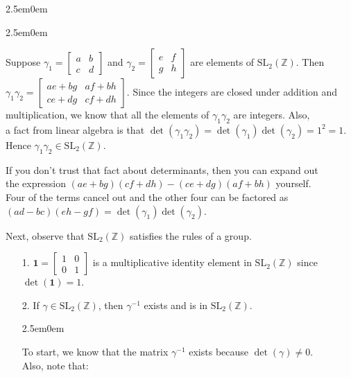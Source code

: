 \documentclass{book}
\newcommand{\exTwoP}{%
   \color{RedViolet}%
   \fontsize{13}{15}\selectfont%
}
\newcommand{\exPP}{%
   \color{RedViolet}%
   \fontsize{12}{14}\selectfont%
}
\newenvironment{myIndent}{%
   \begin{adjustwidth}{2.5em}{0em}%
}{%
   \end{adjustwidth}%
}
\newcommand{\retTwo}{\hfill\bigbreak}
\begin{document}
\begin{enumerate}
\begin{myIndent}
		
		\begin{myIndent}\exPP
			Suppose $\gamma_1 = \left[
			\begin{smallmatrix}
				a & b \\ c & d
			\end{smallmatrix}\right]$ and $\gamma_2 = \left[
			\begin{smallmatrix}
				e & f \\ g & h
			\end{smallmatrix}\right]$ are elements of $\mathrm{SL}_2(\mathbb{Z})$. Then\\ $\gamma_1\gamma_2 = \left[
				\begin{smallmatrix}
					ae + bg & af + bh \\ ce + dg & cf + dh
				\end{smallmatrix}\right]$. Since the integers are closed under addition and\\ [2pt] multiplication, we know that all the elements of $\gamma_1\gamma_2$ are integers. Also,\\ [3pt] a fact from linear algebra is that $\det(\gamma_1\gamma_2) = \det(\gamma_1)\det(\gamma_2) = 1^2 = 1$.\\ [3pt] Hence $\gamma_1 \gamma_2 \in \mathrm{SL}_2(\mathbb{Z})$.\retTwo

				If you don't trust that fact about determinants, then you can expand out\\ the expression $(ae + bg)(cf + dh) - (ce + dg)(af + bh)$ yourself.\\ Four of the terms cancel out and the other four can be factored as\\ $(ad - bc)(eh - gf) = \det(\gamma_1)\det(\gamma_2)$.\retTwo
		\end{myIndent}

		Next, observe that $\mathrm{SL}_2(\mathbb{Z})$ satisfies the rules of a group.
		\begin{enumerate}
			\item[1.] $\bm{1} = \left[
				\begin{smallmatrix}
					1 & 0 \\ 0 & 1
				\end{smallmatrix}\right]$ is a multiplicative identity element in $\mathrm{SL}_2(\mathbb{Z})$ since $\det(\bm{1}) = 1$.\\ [-10pt]
			\item[2.]  If $\gamma \in \mathrm{SL}_2(\mathbb{Z})$, then $\gamma^{-1}$ exists and is in $\mathrm{SL}_2(\mathbb{Z})$.
			\begin{myIndent}\exTwoP
				To start, we know that the matrix $\gamma^{-1}$ exists because $\det(\gamma) \neq 0$.\\ Also, note that:
				

\end{myIndent}
\end{enumerate}
\end{myIndent}
\end{enumerate}
\end{document}
